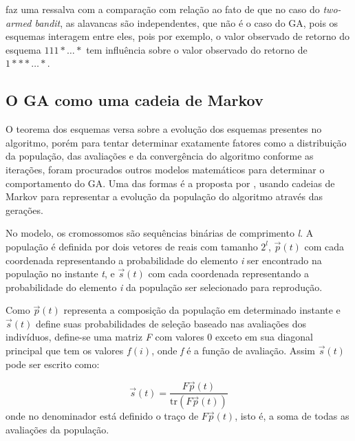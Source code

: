 \citeauthor{Mitchell1996} faz uma ressalva com a comparação com relação ao fato de que no caso do \textit{two-armed bandit}, as alavancas são independentes, que não é o caso do GA, pois os esquemas interagem entre eles, pois por exemplo, o valor observado de retorno do esquema \(111*\ldots*\) tem influência sobre o valor observado do retorno de \(1***\ldots*\).

\subsection{O GA como uma cadeia de Markov}
O teorema dos esquemas versa sobre a evolução dos esquemas presentes no algoritmo, porém para tentar determinar exatamente fatores como a distribuição da população, das avaliações e da convergência do algoritmo conforme as iterações, foram procurados outros modelos matemáticos para determinar o comportamento do GA. Uma das formas é a proposta por \citeauthor{Vose1999}, usando cadeias de Markov para representar a evolução da população do algoritmo através das gerações.

No modelo, os cromossomos são sequências binárias de comprimento \textit{l}. A população é definida por dois vetores de reais com tamanho \(2^l\), \(\overrightarrow{p}(t)\) com cada coordenada representando a probabilidade do elemento \textit{i} ser encontrado na população no instante \textit{t}, e \(\overrightarrow{s}(t)\) com cada coordenada representando a probabilidade do elemento \textit{i} da população ser selecionado para reprodução.

Como \(\overrightarrow{p}(t)\) representa a composição da população em determinado instante e \(\overrightarrow{s}(t)\) define suas probabilidades de seleção baseado nas avaliações dos indivíduos, define-se uma matriz \textit{F} com valores 0 exceto em sua diagonal principal que tem os valores \(f(i)\), onde \textit{f} é a função de avaliação. Assim \(\overrightarrow{s}(t)\) pode ser escrito como:

\begin{equation*}
\overrightarrow{s}(t) = \frac{F\overrightarrow{p}(t)}{\text{tr}(F\overrightarrow{p}(t))}
\end{equation*}
onde no denominador está definido o traço de \(F\overrightarrow{p}(t)\), isto é, a soma de todas as avaliações da população.